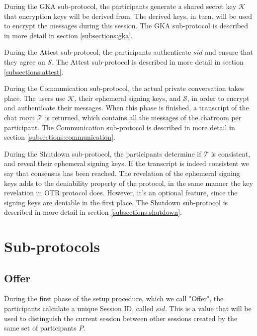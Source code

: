 During the GKA sub-protocol, the participants generate a shared secret key $\mathcal{K}$ that encryption keys will be derived from. The derived keys, in turn, will be used to encrypt the messages during this session. The GKA sub-protocol is described in more detail in section \ref{subsections:gka}.

During the Attest sub-protocol, the participants authenticate $sid$ and ensure that they agree on $\mathcal{S}$. The Attest sub-protocol is described in more detail in section \ref{subsections:attest}.

During the Communication sub-protocol, the actual private conversation takes place. The users use $\mathcal{K}$, their ephemeral signing keys, and $\mathcal{S}$, in order to encrypt and authenticate their messages. When this phase is finished, a transcript of the chat room $\mathcal{T}$ is returned, which contains all the messages of the chatroom per participant. The Communication sub-protocol is described in more detail in section \ref{subsections:communication}.

During the Shutdown sub-protocol, the participants determine if $\mathcal{T}$ is consistent, and reveal their ephemeral signing keys. If the transcript is indeed consistent we say that consensus has been reached. The revelation of the ephemeral signing keys adds to the deniability property of the protocol, in the same manner the key revelation in OTR protocol does. However, it’s an optional feature, since the signing keys are deniable in the first place. The Shutdown sub-protocol is described in more detail in section \ref{subsections:shutdown}.

\begin{algorithm}[t]
  
\end{algorithm}


\section{Sub-protocols}

\subsection{Offer}
\label{subsections:offer}
During the first phase of the setup procedure, which we call "Offer", the participants calculate a unique Session ID, called $sid$. This is a value that will be used to distinguish the current session between other sessions created by the same set of participants $P$.

